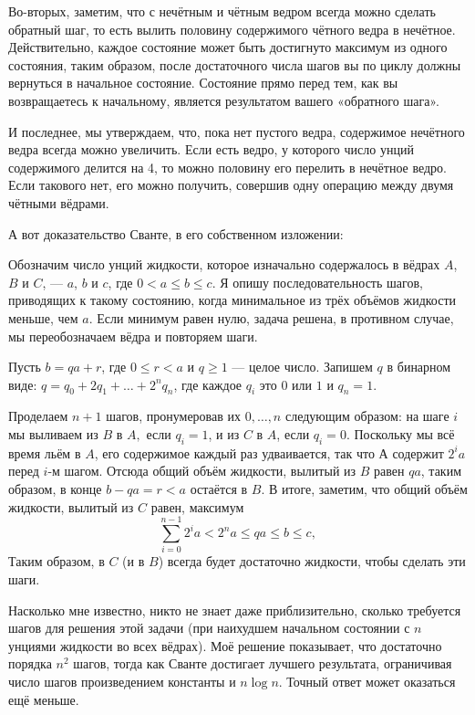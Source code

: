 Во-вторых, заметим, что с нечётным и чётным ведром всегда можно сделать обратный шаг, то есть вылить половину содержимого чётного ведра в нечётное.
Действительно, каждое состояние может быть достигнуто максимум из одного состояния, таким образом, после достаточного числа шагов вы по циклу должны вернуться в начальное состояние.
Состояние прямо перед тем, как вы возвращаетесь к начальному, является результатом вашего «обратного шага».

И последнее, мы утверждаем, что, пока нет пустого ведра, содержимое нечётного ведра всегда можно увеличить.
Если есть ведро, у которого число унций содержимого делится на 4, то можно половину его перелить в нечётное ведро.
Если такового нет, его можно получить, совершив одну операцию между двумя чётными вёдрами.
\heart

А вот доказательство Сванте, в его собственном изложении:

\medskip

Обозначим число унций жидкости, которое изначально содержалось в вёдрах $A$, $B$ и $C$, --- $a$, $b$ и $c$, где $0<a\le b\le c$.
Я опишу последовательность шагов, приводящих к такому состоянию, когда минимальное из трёх объёмов жидкости меньше, чем $a$.
Если минимум равен нулю, задача решена, в противном случае, мы переобозначаем вёдра и повторяем шаги.

Пусть $b = qa + r$, где $0\le r<a$ и $q\ge 1$ --- целое число.
Запишем $q$ в бинарном виде: $q=q_0+2q_1+\dots+2^nq_n$, где каждое $q_i$ это $0$ или $1$ и $q_n = 1$.

Проделаем $n+1$ шагов, пронумеровав их $0,\dots, n$ следующим образом: на шаге $i$ мы выливаем из $B$ в $A,$ если $q_i = 1$, и из $C$ в $A$, если $q_i = 0$.
Поскольку мы всё время льём в $A$, его содержимое каждый раз удваивается, так что $А$ содержит $2^ia$ перед $i$-м шагом.
Отсюда общий объём жидкости, вылитый из $B$ равен $qa$, таким образом, в конце $b-qa=r<a$ остаётся в $B$.
В итоге, заметим, что общий объём жидкости, вылитый из $C$ равен, максимум
\[\sum_{i=0}^{n-1} 2^ia<2^na\le qa\le b\le c,\]
Таким образом, в $C$ (и в $B$) всегда будет достаточно жидкости, чтобы сделать эти шаги.
\heart

Насколько мне известно, никто не знает даже приблизительно, сколько требуется шагов для решения этой задачи (при наихудшем начальном состоянии с $n$ унциями жидкости во всех вёдрах).
Моё решение показывает, что достаточно порядка $n^2$ шагов, тогда как Сванте достигает лучшего результата, ограничивая число шагов произведением константы и $n\log n$.
Точный ответ может оказаться ещё меньше.

